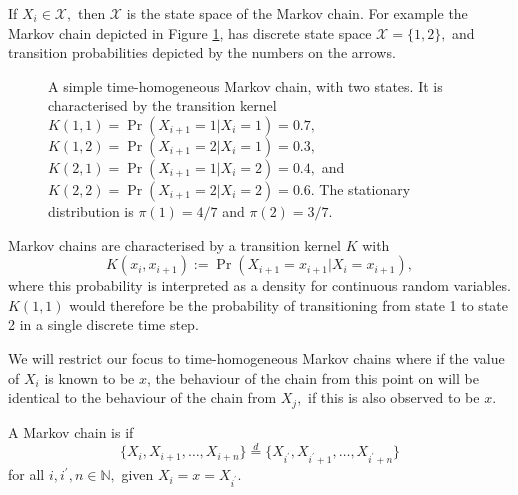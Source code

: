 If $X_i\in\mathcal{X},$ then $\mathcal{X}$ is the state space of the Markov
chain. For example the Markov chain depicted in Figure \ref{fig:MC}, has
discrete state space $\mathcal{X} = \{1, 2\},$ and transition probabilities
depicted by the numbers on the arrows.

\begin{figure}[htbp]
    \centering
    \caption[{
        Simple Markov chain schematic
    }]{
        A simple time-homogeneous Markov chain, with two states.
        It is characterised by the transition kernel
        $K(1, 1) = \Pr(X_{i + 1} = 1 | X_i = 1) = 0.7,$
        $K(1, 2) = \Pr(X_{i + 1} = 2 | X_i = 1) = 0.3,$
        $K(2, 1) = \Pr(X_{i + 1} = 1 | X_i = 2) = 0.4,$ and
        $K(2, 2) = \Pr(X_{i + 1} = 2 | X_i = 2) = 0.6.$ The stationary
        distribution is $\pi(1) = 4/7$ and $\pi(2) = 3/7.$
    }
    \label{fig:MC}
\end{figure}

Markov chains are characterised by a transition kernel $K$ with
$$K(x_i, x_{i + 1}) := \Pr(X_{i + 1} = x_{i + 1} | X_i = x_{i + 1}),$$
where this probability is interpreted as a density for continuous random
variables. $K(1, 1)$ would therefore be the probability of transitioning
from state 1
to state 2 in a single discrete time step.

We will restrict our focus to time-homogeneous Markov chains where
if the value of $X_i$ is known to be $x$, the behaviour of the chain from this point on
will be identical to the behaviour of the chain from $X_j,$ if this is also
observed to be $x$.

\begin{definition}
    A Markov chain is  if
    $$
        \{X_i, X_{i+1}, \dots, X_{i + n}\}
        \overset{d}{=} \{X_{i^\prime}, X_{i^\prime+1}, \dots, X_{i^\prime + n}\}
    $$
    for all $i, i^\prime, n \in \mathbb{N},$ given $X_i = x = X_{i^\prime}.$
\end{definition}


